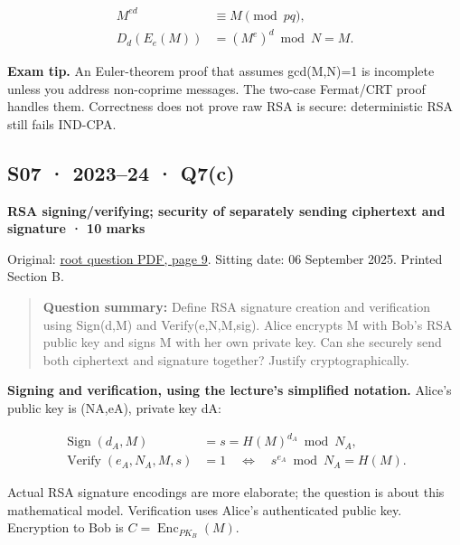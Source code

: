 \documentclass[11pt,a4paper]{article}
\begin{document}
\[
\begin{aligned}M^{ed}&\equiv M\pmod{pq},\\D_d(E_e(M))&=(M^e)^d\bmod N=M.\end{aligned}
\]


{\color{ForestGreen}\textbf{Exam tip.} An Euler-theorem proof that assumes gcd(M,\allowbreak{}N)=\allowbreak{}1 is incomplete unless you address non-coprime messages. The two-case Fermat/\allowbreak{}CRT proof handles them. Correctness does not prove raw RSA is secure: deterministic RSA still fails IND-CPA.}




\clearpage
\subsection{S07 · 2023–24 · Q7(c)}\label{s07}

\textbf{RSA signing/\allowbreak{}verifying; security of separately sending ciphertext and signature · 10 marks}


Original: \href{../../CSE405-Security_Merged.pdf\#page=9}{root question PDF,\allowbreak{} page 9}. Sitting date: 06 September 2025. Printed Section B.



\begin{quote}\small

\textbf{Question summary:} Define RSA signature creation and verification using Sign(d,\allowbreak{}M) and Verify(e,\allowbreak{}N,\allowbreak{}M,\allowbreak{}sig). Alice encrypts M with Bob’s RSA public key and signs M with her own private key. Can she securely send both ciphertext and signature together? Justify cryptographically.



\end{quote}

\textbf{Signing and verification,\allowbreak{} using the lecture’s simplified notation.} Alice’s public key is (NA,\allowbreak{}eA),\allowbreak{} private key dA:



\[
\begin{aligned}\operatorname{Sign}(d_A,M)&=s=H(M)^{d_A}\bmod N_A,\\\operatorname{Verify}(e_A,N_A,M,s)&=1\quad\Longleftrightarrow\quad s^{e_A}\bmod N_A=H(M).\end{aligned}
\]

Actual RSA signature encodings are more elaborate; the question is about this mathematical model. Verification uses Alice’s authenticated public key. Encryption to Bob is \(C=\operatorname{Enc}_{PK_B}(M)\).
\end{document}
